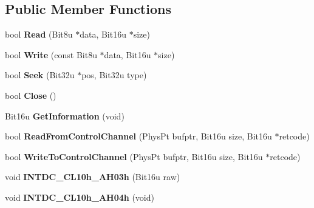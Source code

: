 \subsection*{Public Member Functions}
\begin{DoxyCompactItemize}
\item 
\hypertarget{classdevice__CON_a748000d06f15adcb17f329e32eda83fb}{bool {\bfseries Read} (Bit8u $\ast$data, Bit16u $\ast$size)}\label{classdevice__CON_a748000d06f15adcb17f329e32eda83fb}

\item 
\hypertarget{classdevice__CON_a46c071095c3de95fa316d90c5443fd5f}{bool {\bfseries Write} (const Bit8u $\ast$data, Bit16u $\ast$size)}\label{classdevice__CON_a46c071095c3de95fa316d90c5443fd5f}

\item 
\hypertarget{classdevice__CON_a6d744c09531d7691b538a7f13b3cef7a}{bool {\bfseries Seek} (Bit32u $\ast$pos, Bit32u type)}\label{classdevice__CON_a6d744c09531d7691b538a7f13b3cef7a}

\item 
\hypertarget{classdevice__CON_a69784b10d975098ba5fd46dc4cf33593}{bool {\bfseries Close} ()}\label{classdevice__CON_a69784b10d975098ba5fd46dc4cf33593}

\item 
\hypertarget{classdevice__CON_a8db295befbc8bf8ba25504e65241a4fe}{Bit16u {\bfseries Get\-Information} (void)}\label{classdevice__CON_a8db295befbc8bf8ba25504e65241a4fe}

\item 
\hypertarget{classdevice__CON_aed3d4935317137834c51fbba69221c8f}{bool {\bfseries Read\-From\-Control\-Channel} (Phys\-Pt bufptr, Bit16u size, Bit16u $\ast$retcode)}\label{classdevice__CON_aed3d4935317137834c51fbba69221c8f}

\item 
\hypertarget{classdevice__CON_a6b8675aaab24d4ceeed07a669b8bb512}{bool {\bfseries Write\-To\-Control\-Channel} (Phys\-Pt bufptr, Bit16u size, Bit16u $\ast$retcode)}\label{classdevice__CON_a6b8675aaab24d4ceeed07a669b8bb512}

\item 
\hypertarget{classdevice__CON_a3077748c2aa7cc77405d8a9f80cf89d1}{void {\bfseries I\-N\-T\-D\-C\-\_\-\-C\-L10h\-\_\-\-A\-H03h} (Bit16u raw)}\label{classdevice__CON_a3077748c2aa7cc77405d8a9f80cf89d1}

\item 
\hypertarget{classdevice__CON_a78473f2b01e9d884a462f3af0176677e}{void {\bfseries I\-N\-T\-D\-C\-\_\-\-C\-L10h\-\_\-\-A\-H04h} (void)}\label{classdevice__CON_a78473f2b01e9d884a462f3af0176677e}


\end{DoxyCompactItemize}
